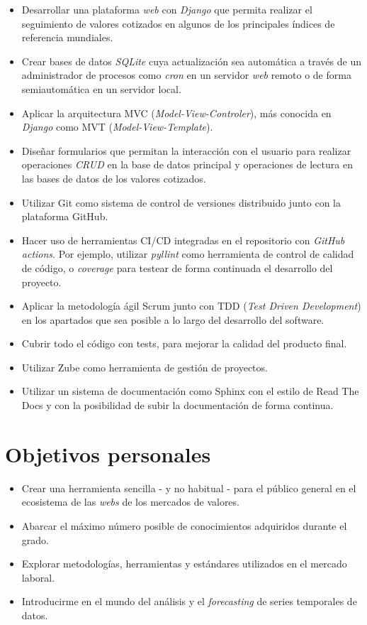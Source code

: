 \begin{itemize}
\tightlist
\item
Desarrollar una plataforma \emph{web} con \emph{Django} que permita
 realizar el seguimiento de valores cotizados en algunos de los principales
 índices de referencia mundiales. 
\item
Crear bases de datos \emph{SQLite} cuya actualización sea automática a través
 de un administrador de procesos como \emph{cron} en un servidor \emph{web} remoto
 o de forma semiautomática en un servidor local. 
\item
Aplicar la arquitectura MVC (\emph{Model-View-Controler}), más conocida en
 \emph{Django} como MVT (\emph{Model-View-Template}).
\item
Diseñar formularios que permitan la interacción con el usuario para realizar 
 operaciones \emph{CRUD} en la base de datos principal y operaciones de
 lectura en las bases de datos de los valores cotizados. 
\item
Utilizar Git como sistema de control de versiones distribuido junto
 con la plataforma GitHub.
\item
Hacer uso de herramientas CI/CD integradas en el repositorio con
 \emph{GitHub actions}. Por ejemplo, utilizar \emph{pyllint} como
 herramienta de control de calidad de código, o \emph{coverage}
 para testear de forma continuada el desarrollo del proyecto. 
\item
Aplicar la metodología ágil Scrum junto con TDD (\emph{Test Driven
 Development}) en los apartados que sea posible a lo largo del desarrollo
 del software. 
\item
Cubrir todo el código con tests, para mejorar la calidad del producto final. 
\item
Utilizar Zube como herramienta de gestión de proyectos.
\item
Utilizar un sistema de documentación como Sphinx con el estilo de Read The Docs
 y con la posibilidad de subir la documentación de forma continua. 
\end{itemize}

\section{Objetivos personales}\label{objetivos-personales}

\begin{itemize}
\tightlist
\item
Crear una herramienta sencilla - y no habitual - para el público general en el 
 ecosistema de las \emph{webs} de los mercados de valores. 
\item  
Abarcar el máximo número posible de conocimientos adquiridos durante el grado.
\item
Explorar metodologías, herramientas y estándares utilizados en el mercado 
 laboral.
\item
Introducirme en el mundo del análisis y el \emph{forecasting} de series
 temporales de datos. 
\end{itemize}
